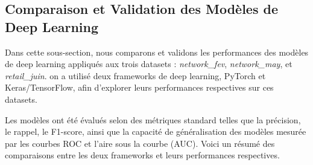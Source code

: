 \subsection{Comparaison et Validation des Modèles de Deep Learning}

Dans cette sous-section, nous comparons et validons les performances des modèles de deep learning appliqués aux trois datasets : \textit{network\_fev}, \textit{network\_may}, et \textit{retail\_juin}. on a utilisé deux frameworks de deep learning, PyTorch et Keras/TensorFlow, afin d'explorer leurs performances respectives sur ces datasets.

Les modèles ont été évalués selon des métriques standard telles que la précision, le rappel, le F1-score, ainsi que la capacité de généralisation des modèles mesurée par les courbes ROC et l'aire sous la courbe (AUC). Voici un résumé des comparaisons entre les deux frameworks et leurs performances respectives.

